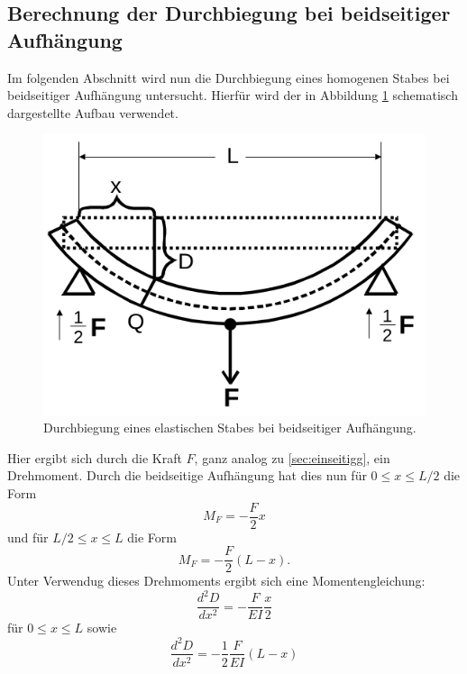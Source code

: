 \subsection{Berechnung der Durchbiegung bei beidseitiger Aufhängung}
\label{sec:beidseitigg}
Im folgenden Abschnitt wird nun die Durchbiegung eines homogenen Stabes bei beidseitiger Aufhängung untersucht.
Hierfür wird der in Abbildung \ref{fig:beidseitig1} schematisch dargestellte Aufbau verwendet.
\begin{figure}[H]
  \centering
  \includegraphics[scale=0.4]{content/Beidseitig.png}
  \caption{Durchbiegung eines elastischen Stabes bei beidseitiger Aufhängung.}
  \label{fig:beidseitig1}
\end{figure}
\noindent
Hier ergibt sich durch die Kraft $F$, ganz analog zu \ref{sec:einseitigg}, ein Drehmoment.
Durch die beidseitige Aufhängung hat dies nun für $0 \leq x \leq L/2$ die Form
\begin{equation}
  M_F = - \frac{F}{2}x
  \label{eqn:drehmomentbeidseitig1}
\end{equation}
und für $L/2 \leq x \leq L$ die Form
\begin{equation}
  M_F = -\frac{F}{2} (L - x).
  \label{eqn:drehmomentbeidseitig2}
\end{equation}
Unter Verwendug dieses Drehmoments ergibt sich eine Momentengleichung:
\begin{equation}
  \frac{d^2 D}{d x^2} =  - \frac{F}{E I} \frac{x}{2}
  \label{eqn:momentengleichungbeidseitig1}
\end{equation}
für $0 \leq x \leq L$ sowie
\begin{equation}
  \frac{d^2 D}{d x^2} = - \frac{1}{2} \frac{F}{E I} (L - x)
  \label{eqn:momentengleichungbeidseitig2}
\end{equation}

